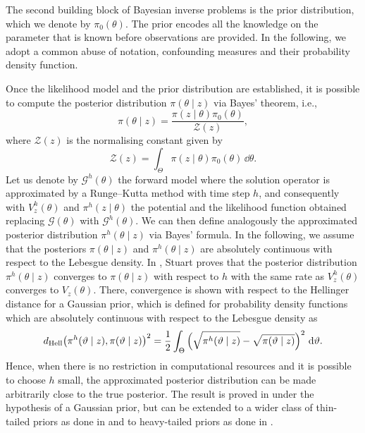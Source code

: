 \documentclass[10pt]{article}
\begin{document}
The second building block of Bayesian inverse problems is the prior distribution, which we denote by $\pi_0(\theta)$. The prior encodes all the knowledge on the parameter that is known before observations are provided. In the following, we adopt a common abuse of notation, confounding measures and their probability density function. 

Once the likelihood model and the prior distribution are established, it is possible to compute the posterior distribution $\pi(\theta \mid z)$ via Bayes' theorem, i.e.,
\begin{equation}
	\pi(\theta\mid z) = \frac{\pi(z\mid \theta)\pi_0(\theta)}{\mathcal Z(z)},
\end{equation}
where $\mathcal Z(z)$ is the normalising constant given by
\begin{equation}
	\mathcal Z(z) = \int_{\Theta} \pi(z\mid \theta) \pi_0(\theta) \, \dd \theta.
\end{equation}
Let us denote by $\mathcal{G}^h(\theta)$ the forward model where the solution operator is approximated by a Runge--Kutta method with time step $h$, and consequently with $V^h_z(\theta)$ and $\pi^h(z\mid\theta)$ the potential and the likelihood function obtained replacing $\mathcal{G}(\theta)$ with $\mathcal{G}^h(\theta)$. We can then define analogously the approximated posterior distribution $\pi^h(\theta \mid z)$ via Bayes' formula. In the following, we assume that the posteriors $\pi(\theta \mid z)$ and $\pi^h(\theta \mid z)$ are absolutely continuous with respect to the Lebesgue density. In \cite[Theorem 4.6]{Stu10}, Stuart proves that the posterior distribution $\pi^h(\theta\mid z)$ converges to $\pi(\theta\mid z)$ with respect to $h$ with the same rate as $V^h_z(\theta)$ converges to $V_z(\theta)$. There, convergence is shown with respect to the Hellinger distance for a Gaussian prior, which is defined for probability density functions which are absolutely continuous with respect to the Lebesgue density as
\begin{equation}
	d_{\mathrm{Hell}}\big(\pi^h(\vartheta\mid z), \pi(\vartheta\mid z)\big)^2 = \frac{1}{2}\int_{\Theta} \Big(\sqrt{\pi^h(\vartheta\mid z)} - \sqrt{\pi(\vartheta\mid z)}\Big)^2 \, \,\mathrm{d} \vartheta.
\end{equation}
Hence, when there is no restriction in computational resources and it is possible to choose $h$ small, the approximated posterior distribution can be made arbitrarily close to the true posterior. The result is proved in \cite{Stu10} under the hypothesis of a Gaussian prior, but can be extended to a wider class of thin-tailed priors as done in \cite{DaS16} and to heavy-tailed priors as done in \cite{Sul17}.
\end{document}
